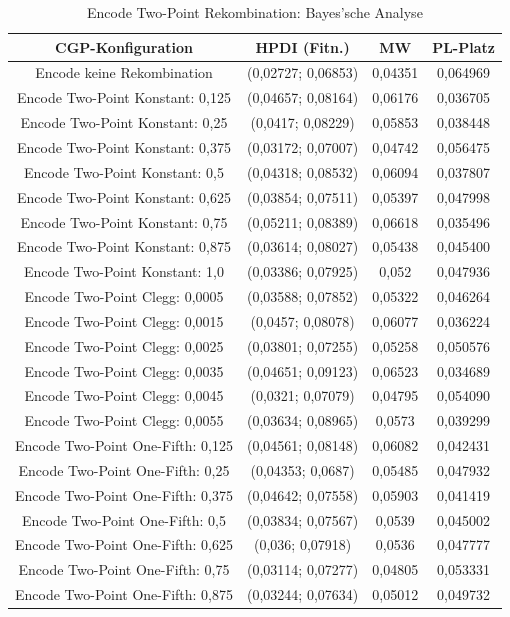 \begin{table}[H]
	\centering
	\begin{tabular}{c | c | c | c}
		\textbf{CGP-Konfiguration} & \textbf{HPDI (Fitn.)} & \textbf{MW} & \textbf{PL-Platz}\\
		\hline
		Encode keine Rekombination & (0,02727; 0,06853) & 0,04351 & 0,064969\\
		\hline
		Encode Two-Point Konstant: 0,125 & (0,04657; 0,08164) & 0,06176 & 0,036705\\
		\hline
		Encode Two-Point Konstant: 0,25 & (0,0417; 0,08229) & 0,05853 & 0,038448\\
		\hline
		Encode Two-Point Konstant: 0,375 & (0,03172; 0,07007) & 0,04742 & 0,056475\\
		\hline
		Encode Two-Point Konstant: 0,5 & (0,04318; 0,08532) & 0,06094 & 0,037807\\
		\hline
		Encode Two-Point Konstant: 0,625 & (0,03854; 0,07511) & 0,05397 & 0,047998\\
		\hline
		Encode Two-Point Konstant: 0,75 & (0,05211; 0,08389) & 0,06618 & 0,035496\\
		\hline
		Encode Two-Point Konstant: 0,875 & (0,03614; 0,08027) & 0,05438 & 0,045400\\
		\hline
		Encode Two-Point Konstant: 1,0 & (0,03386; 0,07925) & 0,052 & 0,047936\\
		\hline
		Encode Two-Point Clegg: 0,0005 & (0,03588; 0,07852) & 0,05322 & 0,046264\\
		\hline
		Encode Two-Point Clegg: 0,0015 & (0,0457; 0,08078) & 0,06077 & 0,036224\\
		\hline
		Encode Two-Point Clegg: 0,0025 & (0,03801; 0,07255) & 0,05258 & 0,050576\\
		\hline
		Encode Two-Point Clegg: 0,0035 & (0,04651; 0,09123) & 0,06523 & 0,034689\\
		\hline
		Encode Two-Point Clegg: 0,0045 & (0,0321; 0,07079) & 0,04795 & 0,054090\\
		\hline
		Encode Two-Point Clegg: 0,0055 & (0,03634; 0,08965) & 0,0573 & 0,039299\\
		\hline
		Encode Two-Point One-Fifth: 0,125 & (0,04561; 0,08148) & 0,06082 & 0,042431\\
		\hline
		Encode Two-Point One-Fifth: 0,25 & (0,04353; 0,0687) & 0,05485 & 0,047932\\
		\hline
		Encode Two-Point One-Fifth: 0,375 & (0,04642; 0,07558) & 0,05903 & 0,041419\\
		\hline
		Encode Two-Point One-Fifth: 0,5 & (0,03834; 0,07567) & 0,0539 & 0,045002\\
		\hline
		Encode Two-Point One-Fifth: 0,625 & (0,036; 0,07918) & 0,0536 & 0,047777\\
		\hline
		Encode Two-Point One-Fifth: 0,75 & (0,03114; 0,07277) & 0,04805 & 0,053331\\
		\hline
		Encode Two-Point One-Fifth: 0,875 & (0,03244; 0,07634) & 0,05012 & 0,049732\\
	\end{tabular}
	\label{table:encodeTwoPointBayesian}
	\caption{Encode Two-Point Rekombination: Bayes'sche Analyse}
\end{table}

